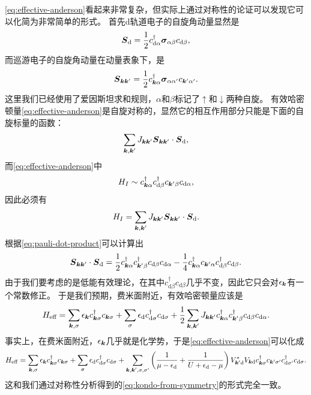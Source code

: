\eqref{eq:effective-anderson}看起来非常复杂，但实际上通过对称性的论证可以发现它可以化简为非常简单的形式。
首先d轨道电子的自旋角动量显然是
\[
    {\vb*{S}}_\text{d} = \frac{1}{2} {c}_{\text{d} \alpha}^\dagger \vb*{\sigma}_{\alpha \beta} {c}_{\text{d} \beta},
\]
而巡游电子的自旋角动量在动量表象下，是
\[
    {\vb*{S}}_{\vb*{k} \vb*{k}'} = \frac{1}{2} {c}^\dagger_{\vb*{k} \alpha} \vb*{\sigma}_{\alpha \alpha'} {c}_{\vb*{k}' \alpha'}.
\]
这里我们已经使用了爱因斯坦求和规则，$\alpha$和$\beta$标记了$\uparrow$和$\downarrow$两种自旋。
有效哈密顿量\eqref{eq:effective-anderson}是自旋对称的，显然它的相互作用部分只能是下面的自旋标量的函数：
\[
    \sum_{\vb*{k}, \vb*{k}'} J_{\vb*{k} \vb*{k}'} {\vb*{S}}_{\vb*{k} \vb*{k}'} \cdot {\vb*{S}}_\text{d},
\]
而\eqref{eq:effective-anderson}中
\[
    {H}_I \sim {c}^\dagger_{\vb*{k} \alpha} {c}^\dagger_{\text{d} \beta} {c}_{\vb*{k}' \beta} {c}_{\text{d} \alpha},
\]
因此必须有
\[
    {H}_I = \sum_{\vb*{k}, \vb*{k}'} J_{\vb*{k} \vb*{k}'} {\vb*{S}}_{\vb*{k} \vb*{k}'} \cdot {\vb*{S}}_\text{d}.
\]
根据\eqref{eq:pauli-dot-product}可以计算出
\[
    {\vb*{S}}_{\vb*{k} \vb*{k}'} \cdot {\vb*{S}}_\text{d} = \frac{1}{2} {c}^\dagger_{\vb*{k} \alpha} {c}^\dagger_{\vb*{k}' \beta} {c}_{\text{d} \beta} {c}_{\text{d} \alpha} - \frac{1}{4} {c}^\dagger_{\vb*{k} \alpha} {c}_{\vb*{k}' \alpha} {c}^\dagger_{\text{d} \beta} {c}_{\text{d} \beta}.
\]
由于我们要考虑的是低能有效理论，在其中${c}^\dagger_{\text{d} \beta} {c}_{\text{d} \beta}$几乎不变，因此它只会对$\epsilon_{\vb*{k}}$有一个常数修正。
于是我们预期，费米面附近，有效哈密顿量应该是
\begin{equation}
    {H}_\text{eff} = \sum_{\vb*{k}, \sigma} \epsilon_{\vb*{k}} {c}_{\vb*{k}\sigma}^\dagger {c}_{\vb*{k} \sigma} + \sum_\sigma \epsilon_\text{d} {c}_{\text{d}\sigma}^\dagger {c}_{\text{d} \sigma} + \frac{1}{2} \sum_{\vb*{k}, \vb*{k}'} J_{\vb*{k} \vb*{k}'} {c}^\dagger_{\vb*{k} \alpha} {c}^\dagger_{\vb*{k}' \beta} {c}_{\text{d} \beta} {c}_{\text{d} \alpha}.
    \label{eq:kondo-from-symmetry}
\end{equation}
事实上，在费米面附近，$\epsilon_{\vb*{k}}$几乎就是化学势，于是\eqref{eq:effective-anderson}可以化成
\[
    {H}_\text{eff} = \sum_{\vb*{k}, \sigma} \epsilon_{\vb*{k}} {c}_{\vb*{k}\sigma}^\dagger {c}_{\vb*{k} \sigma} + \sum_\sigma \epsilon_\text{d} {c}_{\text{d}\sigma}^\dagger {c}_{\text{d} \sigma} 
    + \sum_{\vb*{k}, \vb*{k}', \sigma, \sigma'} \left( \frac{1}{\mu - \epsilon_\text{d}} + \frac{1}{U + \epsilon_\text{d} - \mu} \right) V_{\vb*{k}' \text{d}}^* V_{\vb*{k} \text{d}} {c}^\dagger_{\vb*{k} \sigma} {c}_{\vb*{k}' \sigma'} {c}^\dagger_{\text{d} \sigma'} {c}_{\text{d} \sigma}.
\]
这和我们通过对称性分析得到的\eqref{eq:kondo-from-symmetry}的形式完全一致。

